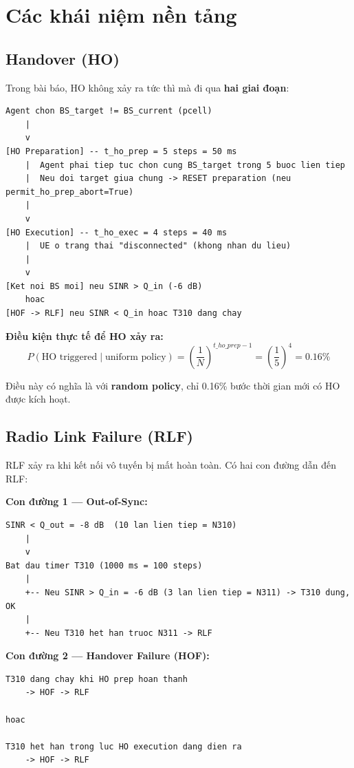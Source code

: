 \documentclass[11pt]{article}
\begin{document}
\section{Các khái niệm nền tảng}

\subsection{Handover (HO)}

Trong bài báo, HO không xảy ra tức thì mà đi qua \textbf{hai giai đoạn}:

\begin{lstlisting}
Agent chon BS_target != BS_current (pcell)
    |
    v
[HO Preparation] -- t_ho_prep = 5 steps = 50 ms
    |  Agent phai tiep tuc chon cung BS_target trong 5 buoc lien tiep
    |  Neu doi target giua chung -> RESET preparation (neu permit_ho_prep_abort=True)
    |
    v
[HO Execution] -- t_ho_exec = 4 steps = 40 ms
    |  UE o trang thai "disconnected" (khong nhan du lieu)
    |
    v
[Ket noi BS moi] neu SINR > Q_in (-6 dB)
    hoac
[HOF -> RLF] neu SINR < Q_in hoac T310 dang chay
\end{lstlisting}

\textbf{Điều kiện thực tế để HO xảy ra:}
\[
P(\text{HO triggered} \mid \text{uniform policy}) = \left(\frac{1}{N}\right)^{t\_ho\_prep - 1} = \left(\frac{1}{5}\right)^4 = 0.16\%
\]

Điều này có nghĩa là với \textbf{random policy}, chỉ 0.16\% bước thời gian mới có HO được kích hoạt.

\subsection{Radio Link Failure (RLF)}

RLF xảy ra khi kết nối vô tuyến bị mất hoàn toàn. Có hai con đường dẫn đến RLF:

\textbf{Con đường 1 --- Out-of-Sync:}

\begin{lstlisting}
SINR < Q_out = -8 dB  (10 lan lien tiep = N310)
    |
    v
Bat dau timer T310 (1000 ms = 100 steps)
    |
    +-- Neu SINR > Q_in = -6 dB (3 lan lien tiep = N311) -> T310 dung, OK
    |
    +-- Neu T310 het han truoc N311 -> RLF
\end{lstlisting}

\textbf{Con đường 2 --- Handover Failure (HOF):}

\begin{lstlisting}
T310 dang chay khi HO prep hoan thanh
    -> HOF -> RLF

hoac

T310 het han trong luc HO execution dang dien ra
    -> HOF -> RLF
\end{lstlisting}
\end{document}
